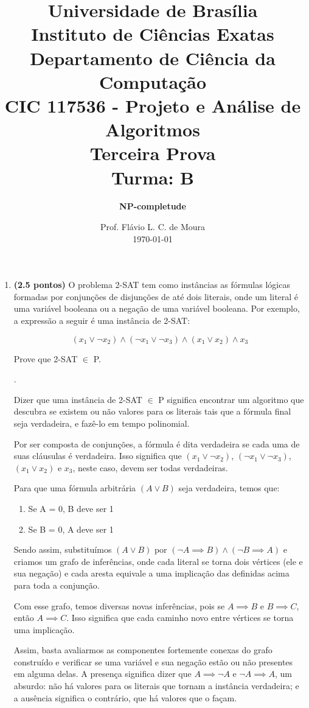 \documentclass[12pt]{article}
\title{{\large Universidade de Brasília \\ Instituto de Ciências Exatas \\
Departamento de Ciência da Computação} \\[1cm]
CIC 117536 - Projeto e Análise de Algoritmos \\[.5cm]  Terceira Prova \\[.5cm] Turma: B}
\author{{\bf NP-completude}}
\date{Prof. Flávio L. C. de Moura \\[.5cm] \today}
\newcommand{\resposta}[1]{ \noindent {\bf Solução}. {\color{blue} #1}}
\begin{document}
\maketitle

\begin{enumerate}
\item {\bf (2.5 pontos)} O problema 2-SAT tem como instâncias as
  fórmulas lógicas formadas por conjunções de disjunções de até dois
  literais, onde um literal é uma variável booleana ou a negação de
  uma variável booleana. Por exemplo, a expressão a seguir é uma
  instância de 2-SAT:

  $$(x_1\lor \neg x_2)\land (\neg x_1 \lor \neg x_3) \land (x_1 \lor x_2) \land x_3$$

  Prove que 2-SAT $\in$ P.

 
  \resposta{Dizer que uma instância de 2-SAT $\in$ P significa encontrar um algoritmo que descubra se existem ou não valores para os literais tais que a fórmula final seja verdadeira, e fazê-lo em tempo polinomial.
  
  Por ser composta de conjunções, a fórmula é dita verdadeira se cada uma de suas cláusulas é verdadeira. Isso significa que $(x_1\lor \neg x_2)$, $(\neg x_1 \lor \neg x_3)$, $(x_1 \lor x_2)$ e $x_3$, neste caso, devem ser todas verdadeiras.
  
  Para que uma fórmula arbitrária $(A \lor B)$ seja verdadeira, temos que:
  
  \begin{enumerate}
      \item Se A = 0, B deve ser 1
      \item Se B = 0, A deve ser 1
  \end{enumerate}
  
  Sendo assim, substituímos $(A \lor B)$ por $(\neg A \implies B) \land (\neg B \implies A) $ e criamos um grafo de inferências, onde cada literal se torna dois vértices (ele e sua negação) e cada aresta equivale a uma implicação das definidas acima para toda a conjunção.
  
  Com esse grafo, temos diversas novas inferências, pois se $A \implies B$ e $B \implies C$, então $A \implies C$. Isso significa que cada caminho novo entre vértices se torna uma implicação.
  
  Assim, basta avaliarmos as componentes fortemente conexas do grafo construído e verificar se uma variável e sua negação estão ou não presentes em alguma delas. A presença significa dizer que $A \implies \neg A$ e $\neg A \implies A$, um absurdo: não há valores para os literais que tornam a instância verdadeira; e a ausência significa o contrário, que há valores que o façam.
  
}
\end{enumerate}
\end{document}
